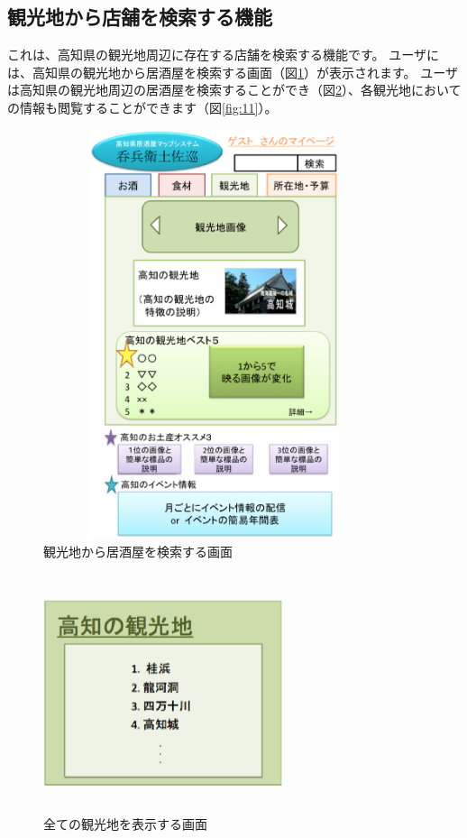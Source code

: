 \documentclass[a4j,titlepage]{jarticle}
\begin{document}
\newpage
\subsection{観光地から店舗を検索する機能}
これは、高知県の観光地周辺に存在する店舗を検索する機能です。
ユーザには、高知県の観光地から居酒屋を検索する画面（図\ref{fig:9}）が表示されます。
ユーザは高知県の観光地周辺の居酒屋を検索することができ（図\ref{fig:10}）、各観光地においての情報も閲覧することができます（図\ref{fig:11}）。

\begin {figure}[htpb]
    \begin{center}
    \includegraphics [height=12cm, width=10cm]{extrnal_design_document_image/9.eps}
    \caption {観光地から居酒屋を検索する画面}
    \label {fig:9}
    \end{center}
\end {figure}

\begin {figure}[htpb]
    \begin{center}
    \includegraphics [height=7cm, width=7cm]{extrnal_design_document_image/10.eps}
    \caption {全ての観光地を表示する画面}
    \label {fig:10}
    \end{center}
\end {figure}
\end{document}
